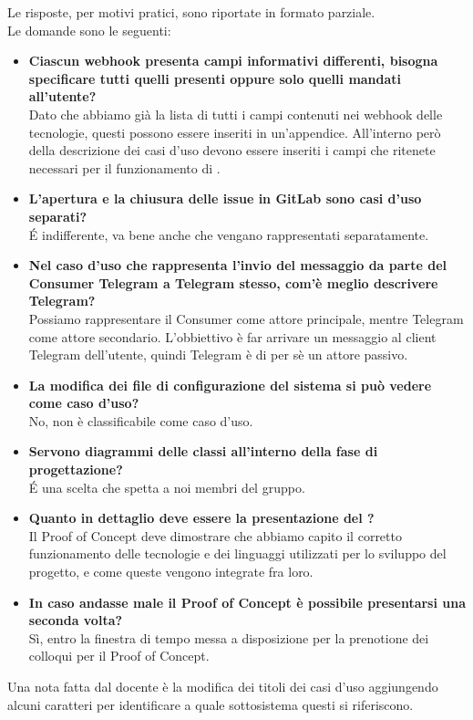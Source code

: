     	Le risposte, per motivi pratici, sono riportate in formato parziale.\\
        Le domande sono le seguenti:
    	
    	\begin{itemize}
    		\item \textbf{Ciascun webhook presenta campi informativi differenti, bisogna specificare tutti quelli presenti oppure solo quelli mandati all'utente?}\\
            Dato che abbiamo già la lista di tutti i campi contenuti nei webhook delle tecnologie, questi possono essere inseriti in un'appendice. All'interno però della descrizione dei casi d'uso devono essere inseriti i campi che ritenete necessari per il funzionamento di \progetto.
    		\item \textbf{L'apertura e la chiusura delle issue in GitLab sono casi d'uso separati?}\\
            \'E indifferente, va bene anche che vengano rappresentati separatamente.
    		\item \textbf{Nel caso d'uso che rappresenta l'invio del messaggio da parte del Consumer Telegram a Telegram stesso, com'è meglio descrivere Telegram?}\\
            Possiamo rappresentare il Consumer come attore principale, mentre Telegram come attore secondario. L'obbiettivo è far arrivare un messaggio al client Telegram dell'utente, quindi Telegram è di per sè un attore passivo.
    		\item \textbf{La modifica dei file di configurazione del sistema si può vedere come caso d'uso?}\\
            No, non è classificabile come caso d'uso.
    		\item \textbf{Servono diagrammi delle classi all'interno della fase di progettazione?}\\
            \'E una scelta che spetta a noi membri del gruppo.
    		\item \textbf{Quanto in dettaglio deve essere la presentazione del ?}\\
            Il Proof of Concept deve dimostrare che abbiamo capito il corretto funzionamento delle tecnologie e dei linguaggi utilizzati per lo sviluppo del progetto, e come queste vengono integrate fra loro.
    		\item \textbf{In caso andasse male il Proof of Concept è possibile presentarsi una seconda volta?}\\
            Sì, entro la finestra di tempo messa a disposizione per la prenotione dei colloqui per il Proof of Concept.
    	\end{itemize}
    	Una nota fatta dal docente è la modifica dei titoli dei casi d'uso aggiungendo alcuni caratteri per identificare a quale sottosistema questi si riferiscono.
